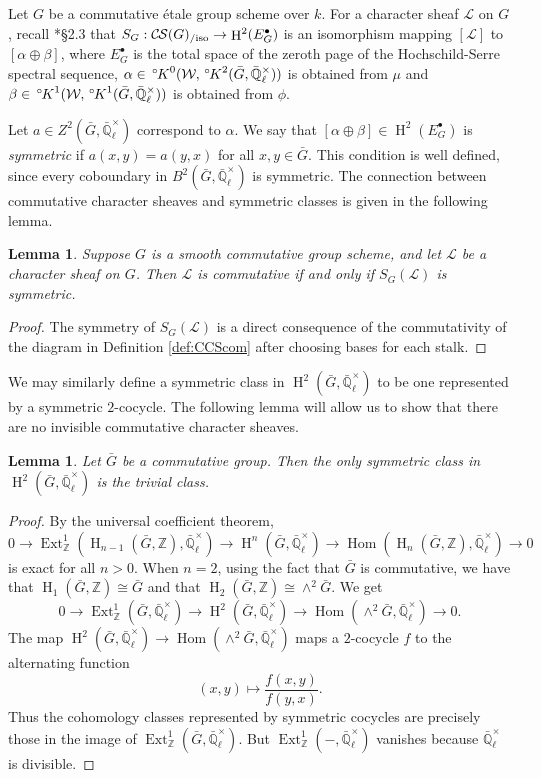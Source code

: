 \documentclass[10pt]{amsart}
\theoremstyle{plain}
\newtheorem{lemma}[theorem]{Lemma}
\theoremstyle{definition}
\newcommand{\ZZ}{{\mathbb{Z}}}
\newcommand{\EE}{\mathbb{\bar Q}_\ell}
\newcommand{\EEx}{\EE^\times}
\newcommand{\Weil}[1]{\mathcal{W}_{#1}}
\DeclareMathOperator{\Hom}{Hom}
\DeclareMathOperator{\Ext}{Ext}
\DeclareMathOperator{\Hh}{H}
\newcommand{\cs}[1]{{\mathcal{#1}}}
\newcommand{\CS}{{\mathcal{C\hskip-0.8pt S}}}
\newcommand{\CSiso}[1]{\CS(#1)_{/\text{iso}}}
\newcommand{\bG}{\bar{G}}
\newcommand{\oK}{{\,^\circ \hskip-1pt K}}
\begin{document}
Let $G$ be a commutative \'etale group scheme over $k$. For a character sheaf $\cs{L}$ on $G$, recall
\cite{cunningham-roe:13a}*{\S 2.3} that $S_G : \CSiso{G} \to \Hh^2(E_G^\bullet)$ is an isomorphism mapping
$[\cs{L}]$ to $[\alpha \oplus \beta]$, where $E_G^\bullet$ is the total space of the zeroth page
of the Hochschild-Serre spectral sequence, $\alpha \in \oK^0(\Weil{}, \oK^2(\bG, \EEx))$ is obtained from $\mu$ and
$\beta \in \oK^1(\Weil{}, \oK^1(\bG, \EEx))$ is obtained from $\phi$.

Let $a \in Z^2(\bG, \EEx)$ correspond to $\alpha$.  We say that $[\alpha \oplus \beta] \in \Hh^2(E_G^\bullet)$
is \emph{symmetric} if $a(x,y) = a(y,x)$ for all $x,y \in \bG$.  This condition is well defined, since every
coboundary in $B^2(\bG, \EEx)$ is symmetric.  The connection between commutative character sheaves
and symmetric classes is given in the following lemma.

\begin{lemma} \label{lem:symccslink}
Suppose $G$ is a smooth commutative group scheme, and let $\cs{L}$ be a character sheaf on $G$.
Then $\cs{L}$ is commutative if and only if $S_G(\cs{L})$ is symmetric.
\end{lemma}
\begin{proof}
The symmetry of $S_G(\cs{L})$ is a direct consequence of the commutativity of the diagram in Definition \ref{def:CCScom}
after choosing bases for each stalk.
\end{proof}

We may similarly define a symmetric class in $\Hh^2(\bG, \EEx)$ to be one represented by a symmetric $2$-cocycle.
The following lemma will allow us to show that there are no invisible commutative character sheaves.

\begin{lemma} \label{lem:symtriv}
Let $\bG$ be a commutative group.  Then the only symmetric class in $\Hh^2(\bG, \EEx)$ is the trivial class.
\end{lemma}

\begin{proof}
By the universal coefficient theorem,
\[
0 \to \Ext^1_\ZZ(\Hh_{n-1}(\bG, \ZZ), \EEx) \to \Hh^n(\bG, \EEx) \to \Hom(\Hh_n(\bG, \ZZ), \EEx) \to 0
\]
is exact for all $n > 0$.  When $n = 2$, using the fact that $\bG$ is commutative, we have that $\Hh_1(\bG, \ZZ) \cong \bG$
and that $\Hh_2(\bG, \ZZ) \cong \wedge^2 \bG$. We get
\[
0 \to \Ext^1_\ZZ(\bG, \EEx) \to \Hh^2(\bG, \EEx) \to \Hom(\wedge^2 \bG, \EEx) \to 0.
\]
The map $\Hh^2(\bG, \EEx) \to \Hom(\wedge^2 \bG, \EEx)$ maps a $2$-cocycle $f$ to the alternating function
\[
(x,y) \mapsto \frac{f(x,y)}{f(y,x)}.
\]
Thus the cohomology classes represented by symmetric cocycles are precisely those in the image of $\Ext^1_\ZZ(\bG, \EEx)$.
But $\Ext^1_\ZZ(-, \EEx)$ vanishes because $\EEx$ is divisible.
\end{proof}
\end{document}
